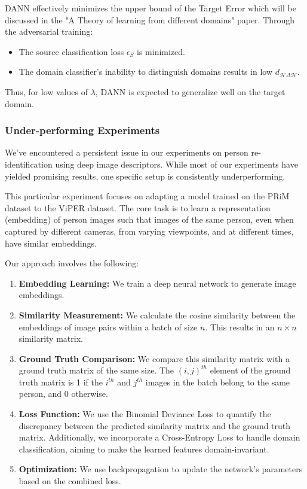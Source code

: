 \documentclass{article}
\begin{document}
DANN effectively minimizes the upper bound of the Target Error which will be discussed in the "A Theory of learning from different domains" paper. Through the adversarial training:
\begin{itemize}[noitemsep]
    \item The source classification loss \( \epsilon_S \) is minimized.
    \item The domain classifier's inability to distinguish domains results in low \( d_{\mathcal{H}\Delta\mathcal{H}} \).
\end{itemize}

Thus, for low values of \( \lambda \), DANN is expected to generalize well on the target domain.


\subsubsection{Under-performing Experiments}
We've encountered a persistent issue in our experiments on person re-identification using deep image descriptors. While most of our experiments have yielded promising results, one specific setup is consistently underperforming.

This particular experiment focuses on adapting a model trained on the PRiM dataset to the ViPER dataset. The core task is to learn a representation (embedding) of person images such that images of the same person, even when captured by different cameras, from varying viewpoints, and at different times, have similar embeddings.

Our approach involves the following:

\begin{enumerate}
    \item \textbf{Embedding Learning:} We train a deep neural network to generate image embeddings.
    \item \textbf{Similarity Measurement:} We calculate the cosine similarity between the embeddings of image pairs within a batch of size $n$. This results in an $n \times n$ similarity matrix.
    \item \textbf{Ground Truth Comparison:} We compare this similarity matrix with a ground truth matrix of the same size. The $(i, j)^{th}$ element of the ground truth matrix is 1 if the $i^{th}$ and $j^{th}$ images in the batch belong to the same person, and 0 otherwise.
    \item \textbf{Loss Function:} We use the Binomial Deviance Loss to quantify the discrepancy between the predicted similarity matrix and the ground truth matrix. Additionally, we incorporate a Cross-Entropy Loss to handle domain classification, aiming to make the learned features domain-invariant.
    \item \textbf{Optimization:} We use backpropagation to update the network's parameters based on the combined loss.
\end{enumerate}
\end{document}
